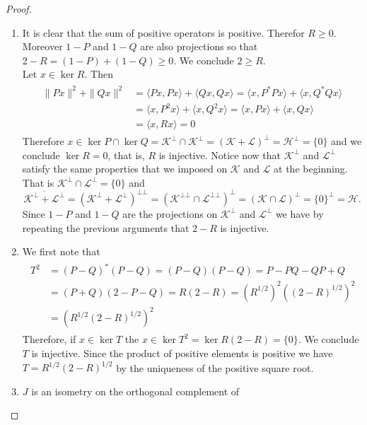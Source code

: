 \begin{proof}
\begin{enumerate}
\item It is clear that the sum of positive operators is positive. Therefor $R\geq 0$. Moreover $1-P$ and $1-Q$ are also projections so that $2-R=(1-P)+(1-Q)\geq 0$. We conclude $2\geq R$. \\
Let $x\in\ker R$. Then
\begin{align}
\begin{split}
\|Px\|^2+\|Qx\|^2&=\langle Px,Px \rangle + \langle Qx,Qx\rangle = \langle x,P^*Px\rangle +\langle x, Q^*Qx\rangle \\
&=\langle x, P^2x\rangle + \langle x, Q^2x\rangle = \langle x,Px\rangle + \langle x,Qx\rangle \\
&=\langle x,Rx\rangle = 0
\end{split}
\end{align}
Therefore $x\in\ker P\cap\ker Q=\mathcal{K}^\bot\cap\mathcal{K}^\bot=(\mathcal{K}+\mathcal{L})^\bot=\mathcal{H}^\bot=\{0\}$ and we conclude $\ker R = {0}$, that is, $R$ is injective. Notice now that $\mathcal{K}^\bot$ and $\mathcal{L}^\bot$ satisfy the same properties that we imposed on $\mathcal{K}$ and $\mathcal{L}$ at the beginning. That is $\mathcal{K}^\bot\cap\mathcal{L}^\bot=\{0\}$ and
\begin{equation}
\overline{\mathcal{K}^\bot+\mathcal{L}^\bot}=(\mathcal{K}^\bot+\mathcal{L}^\bot)^{\bot\bot}=(\mathcal{K}^{\bot\bot}\cap\mathcal{L}^{\bot\bot})^\bot = (\mathcal{K}\cap\mathcal{L})^\bot=\{0\}^\bot = \mathcal{H}.
\end{equation}
Since $1-P$ and $1-Q$ are the projections on $\mathcal{K}^\bot$ and $\mathcal{L}^\bot$ we have by repeating the previous arguments that $2-R$ is injective.
\item We first note that 
\begin{align}
\begin{split}
T^2&=(P-Q)^*(P-Q)=(P-Q)(P-Q)=P-PQ-QP+Q \\
&=(P+Q)(2-P-Q)=R(2-R)=(R^{1/2})^2((2-R)^{1/2})^2 \\
&=(R^{1/2}(2-R)^{1/2})^2
\end{split}
\end{align}
Therefore, if $x\in \ker T$ the $x\in\ker T^2=\ker R(2-R)=\{0\}$. We conclude $T$ is injective. Since the product of positive elements is positive we have $T=R^{1/2}(2-R)^{1/2}$ by the uniqueness of the positive square root.
\item $J$ is an isometry on the orthogonal complement of

\end{enumerate}
\end{proof}
